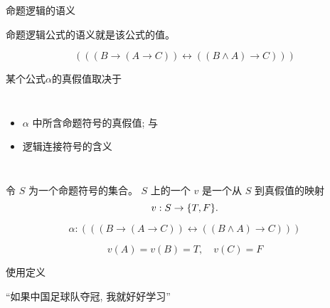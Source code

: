 
\begin{frame}{}
  \begin{center}
    命题逻辑的语义
  \end{center}
\end{frame}

\begin{frame}{}
  \begin{center}
    命题逻辑公式的语义就是该公式的值。

    \[
      (((B \to (A \to C)) \leftrightarrow ((B \land A) \to C)))
    \]

    \pause
    \vspace{0.60cm}
    某个公式$\alpha$的真假值取决于
    \vspace{0.30cm}
    \begin{columns}
        \begin{itemize}
          \setlength{\itemsep}{6pt}
          \item $\alpha$ 中所含命题符号的真假值; 与
          \item 逻辑连接符号的含义
        \end{itemize}
    \end{columns}
  \end{center}
\end{frame}

\begin{frame}{}
  \begin{definition}[真值指派 ($v$)]
    令 $S$ 为一个命题符号的集合。
    $S$ 上的一个 $v$ 是一个从 $S$ 到真假值的映射
    \[
      v: S \to \{T, F\}.
    \]
  \end{definition}

  \pause
  \vspace{0.30cm}
  \[
    \alpha: (((B \to (A \to C)) \leftrightarrow ((B \land A) \to C)))
  \]

  \[
    v(A) = v(B) = T, \quad v(C) = F
  \]
\end{frame}

\begin{frame}{}
  \begin{center}
    使用定义
  \end{center}

  \begin{definition}
    
  \end{definition}

  ``如果中国足球队夺冠, 我就好好学习''
\end{frame}

